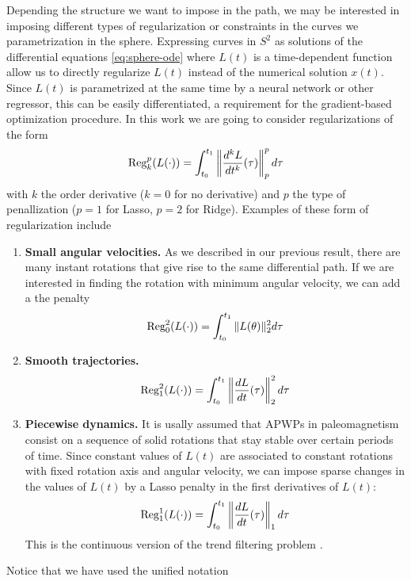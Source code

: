 Depending the structure we want to impose in the path, we may be interested in imposing different types of regularization or constraints in the curves we parametrization in the sphere. 
Expressing curves in $S^2$ as solutions of the differential equations \eqref{eq:sphere-ode} where $L(t)$ is a time-dependent function allow us to directly regularize $L(t)$ instead of the numerical solution $x(t)$. 
Since $L(t)$ is parametrized at the same time by a neural network or other regressor, this can be easily differentiated, a requirement for the gradient-based optimization procedure.
In this work we are going to consider regularizations of the form 
\begin{equation}
    \operatorname{\text{Reg}}_k^p (L(\cdot))
    = 
    \int_{t_0}^{t_1} \left \| \frac{d^k L}{dt^k} (\tau) \right \|_p^p d\tau
\end{equation}
with $k$ the order derivative ($k=0$ for no derivative) and $p$ the type of penallization ($p=1$ for Lasso, $p=2$ for Ridge).
Examples of these form of regularization include
\begin{enumerate}
    \item \textbf{Small angular velocities.} As we described in our previous result, there are many instant rotations that give rise to the same differential path. If we are interested in finding the rotation with minimum angular velocity, we can add a the penalty
    \begin{equation}
        \operatorname{\text{Reg}}_0^2 (L(\cdot)) = \int_{t_0}^{t_1} \| L(\theta) \|_2^2 d\tau
    \end{equation}
    \item \textbf{Smooth trajectories.}
    \begin{equation}
        \operatorname{\text{Reg}}_1^2 (L(\cdot)) = \int_{t_0}^{t_1} \left \| \frac{dL}{dt}(\tau) \right \|_2^2 d\tau
    \end{equation}
    \item \textbf{Piecewise dynamics. } It is usally assumed that APWPs in paleomagnetism consist on a sequence of solid rotations that stay stable over certain periods of time. Since constant values of $L(t)$ are associated to constant rotations with fixed rotation axis and angular velocity, we can impose sparse changes in the values of $L(t)$ by a Lasso penalty in the first derivatives of $L(t)$:
    \begin{equation}
        \operatorname{\text{Reg}}_1^1 (L(\cdot)) = \int_{t_0}^{t_1} \left \| \frac{dL}{dt}(\tau) \right \|_1 d\tau
    \end{equation}
    This is the continuous version of the trend filtering problem \cite{tibs-trend-filter}.
\end{enumerate}
Notice that we have used the unified notation 

